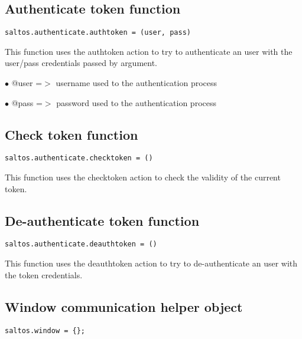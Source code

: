 \documentclass[a4paper]{book}
\begin{document}
\hypertarget{toc440}{}
\subsection{Authenticate token function}

\begin{lstlisting}
saltos.authenticate.authtoken = (user, pass)
\end{lstlisting}

This function uses the authtoken action to try to authenticate an user with the user/pass
credentials passed by argument.

\begin{compactitem}
\item[\color{myblue}$\bullet$] @user =$>$ username used to the authentication process
\item[\color{myblue}$\bullet$] @pass =$>$ password used to the authentication process
\end{compactitem}

\hypertarget{toc441}{}
\subsection{Check token function}

\begin{lstlisting}
saltos.authenticate.checktoken = ()
\end{lstlisting}

This function uses the checktoken action to check the validity of the current token.

\hypertarget{toc442}{}
\subsection{De-authenticate token function}

\begin{lstlisting}
saltos.authenticate.deauthtoken = ()
\end{lstlisting}

This function uses the deauthtoken action to try to de-authenticate an user with the token
credentials.

\hypertarget{toc443}{}
\subsection{Window communication helper object}

\begin{lstlisting}
saltos.window = {};
\end{lstlisting}
\end{document}
